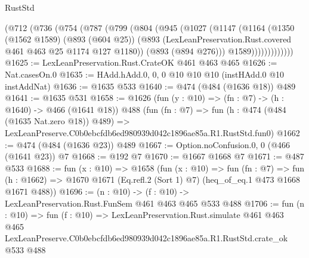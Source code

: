 \begin{lexlean}{RustStd}
\begin{coremodule}
          (@712
            (@736
              (@754
                (@787
                  (@799
                    (@804
                      (@945
                        (@1027
                          (@1147
                            (@1164
                              (@1350
                                (@1562 @1589)
                                (@893 (@604 @25))
                                (@893
                                  (LexLeanPreservation.Rust.covered @461 @463 @25 @1174 @127 @1180))
                                (@893 (@894 @276)))
                              @1589)))))))))))))
@1625 := LexLeanPreservation.Rust.CrateOK @461 @463 @465
@1626 := Nat.casesOn.{0}
@1635 := HAdd.hAdd.{0, 0, 0} @10 @10 @10 (instHAdd.{0} @10 instAddNat)
@1636 := @1635 @533
@1640 := @474 (@484 (@1636 @18)) @489
@1641 := @1635 @531
@1658 := @1626
    (fun (y : @10) => (fn : @7) -> (h : @1640) -> @466 (@1641 @18))
    @488
    (fun (fn : @7) =>
    fun (h : @474 (@484 (@1635 Nat.zero @18)) @489) =>
    LexLeanPreserve.C0b0ebcfdb6ed980939d042c1896ae85a.R1.RustStd.fun0)
@1662 := @474 (@484 (@1636 @23)) @489
@1667 := Option.noConfusion.{0, 0} (@466 (@1641 @23)) @7
@1668 := @192 @7
@1670 := @1667 @1668 @7
@1671 := @487 @533
@1688 := fun (x : @10) =>
  @1658
    (fun (x : @10) =>
    fun (fn : @7) =>
    fun (h : @1662) => @1670 @1671 (Eq.refl.{2} (Sort 1) @7) (heq_of_eq.{1} @473 @1668 @1671 @488))
@1696 := (n : @10) -> (f : @10) -> LexLeanPreservation.Rust.FunSem @461 @463 @465 @533 @488
@1706 := fun (n : @10) =>
  fun (f : @10) =>
  LexLeanPreservation.Rust.simulate
    @461
    @463
    @465
    LexLeanPreserve.C0b0ebcfdb6ed980939d042c1896ae85a.R1.RustStd.crate_ok
    @533
    @488
\end{coremodule}
\end{lexlean}
